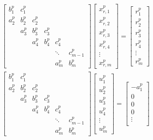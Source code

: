 \begin{align}
& \begin{bmatrix}
b_1^p & c_1^p \\
a_2^p & b_2^p & c_2^p \\
      & a_3^p & b_3^p & c_3^p \\
      &       & a_4^p & b_4^p & c_4^p \\
      &       &       &       &  \ddots & c_{m-1}^p\\
      &       &       &       &     a_{m}^p  & b_{m}^p
\end{bmatrix}
\begin{bmatrix}
x_{r,1}^p \\
x_{r,2}^p \\
x_{r,3}^p \\
x_{r,4}^p \\
\vdots \\
x_{r,m}^p
\end{bmatrix}
=
\begin{bmatrix}
r_1^p \\
r_2^p \\
r_3^p \\
r_4^p \\
\vdots \\
r_m^p
\end{bmatrix} & \label{eqn:primary-system} \\
%
%
%
& \begin{bmatrix}
b_1^p & c_1^p \\
a_2^p & b_2^p & c_2^p \\
      & a_3^p & b_3^p & c_3^p \\
      &       & a_4^p & b_4^p & c_4^p \\
      &       &       &       &  \ddots & c_{m-1}^p\\
      &       &       &       &     a_{m}^p  & b_{m}^p
\end{bmatrix}
\begin{bmatrix}
u_1^p \\
u_2^p \\
u_3^p \\
u_4^p \\
\vdots \\
u_m^p
\end{bmatrix}
=
\begin{bmatrix}
-a_1^p \\
0 \\
0 \\
0 \\
\vdots \\

\end{bmatrix}
\end{align}
